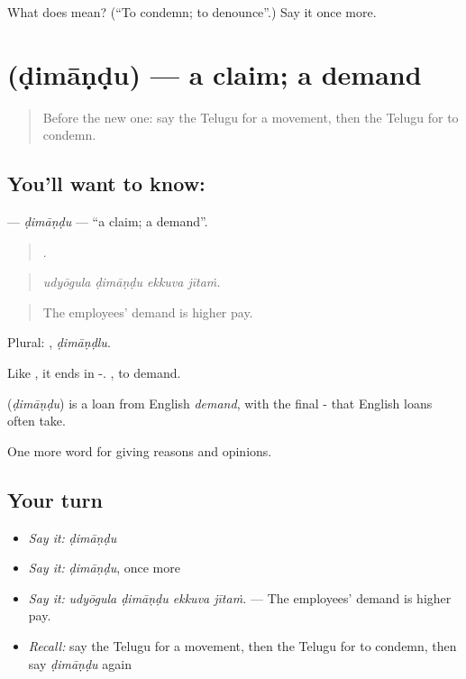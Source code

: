 \begin{tcolorbox}[breakable,colback=teal!4,colframe=teal!35!black,title={Before you move on}]
What does  mean? (\textquotedblleft{}To condemn; to denounce\textquotedblright{}.) Say it once more.
\end{tcolorbox}
\section[\texorpdfstring{\te{డిమాండు} (ḍimāṇḍu)}{డిమాండు (ḍimāṇḍu)}]{ (ḍimāṇḍu) — a claim; a demand}

\label{lesson:TE-C407-dimandu}



\begin{quote}
Before the new one: say the Telugu for a movement, then the Telugu for to condemn.
\end{quote}

\subsection*{You'll want to know: }
\textbf{} — \emph{ḍimāṇḍu} — \textquotedblleft{}a claim; a demand\textquotedblright{}.

\begin{quote}
   .
\end{quote}

\begin{quote}
\emph{udyōgula ḍimāṇḍu ekkuva jītaṁ.}
\end{quote}

\begin{quote}
The employees’ demand is higher pay.
\end{quote}

Plural: , \emph{ḍimāṇḍlu}.

Like , it ends in -.  , to demand.

\begin{cousinweb}
\textbf{} (\emph{ḍimāṇḍu}) is a loan from English \emph{demand}, with the final - that English loans often take.
\end{cousinweb}

\begin{grammarlens}[title={What you've built}]
One more word for giving reasons and opinions.
\end{grammarlens}

\subsection*{Your turn}
\begin{itemize}
\raggedright
  \item \emph{Say it:} \emph{ḍimāṇḍu}
  \item \emph{Say it:} \emph{ḍimāṇḍu}, once more
  \item \emph{Say it:} \emph{udyōgula ḍimāṇḍu ekkuva jītaṁ.} — The employees’ demand is higher pay.
  \item \emph{Recall:} say the Telugu for a movement, then the Telugu for to condemn, then say \emph{ḍimāṇḍu} again
\end{itemize}

